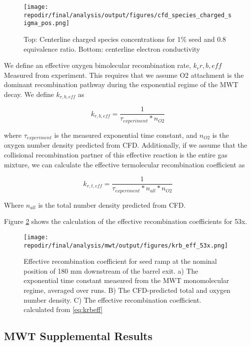 \begin{figure}[h]
    \texttt{[image: \\repodir/final/analysis/output/figures/cfd\_species\_charged\_sigma\_pos.png]} 
    \caption{Top: Centerline charged species concentrations for 1\% seed and 0.8 equivalence ratio. Bottom: centerline electron conductivity }
    \label{fig:SI_cfd_species_charged_sigma_pos}
\end{figure}



\clearpage

We define an effective oxygen bimolecular recombination rate, $k_r{r, b,eff}$ Measured from experiment. This requires that we assume O2 attachment is the dominant recombination pathway during the exponential regime of the MWT decay. We define $k_{r,b,eff}$ as 

\begin{equation}
    \label{eq:krbeff}
    k_{r,b,eff} = \frac{1}{\tau_{experiment} *  n_{O2}}
\end{equation}

where $\tau_{experiment}$ is the measured exponential time constant,  and $n_{O2}$ is the oxygen number density predicted from CFD. Additionally, if we assume that the collisional recombination partner of this effective reaction is the entire gas mixture, we can calculate the effective termolecular recombination coefficient as


\begin{equation}
    \label{eq:krteff}
    k_{r,t,eff} = \frac{1}{\tau_{experiment} * n_{all} *  n_{O2}}
\end{equation}

Where $n_{all}$ is the total number density predicted from CFD.

Figure \ref{fig:SI_krb_eff_53x} shows the calculation of the effective recombination coefficients for 53x.

\begin{figure}[]
\centering
\texttt{[image: \\repodir/final/analysis/mwt/output/figures/krb\_eff\_53x.png]}
\caption{Effective recombination coefficient for seed ramp at the nominal position of 180 mm downstream of the barrel exit. a) The exponential time constant measured from the MWT monomolecular regime, averaged over runs. B) The CFD-predicted total and oxygen number density. C) The effective recombination coefficient. calculated from \ref{eq:krbeff}}
\label{fig:SI_krb_eff_53x}
\end{figure}

\subsection{MWT Supplemental Results}


